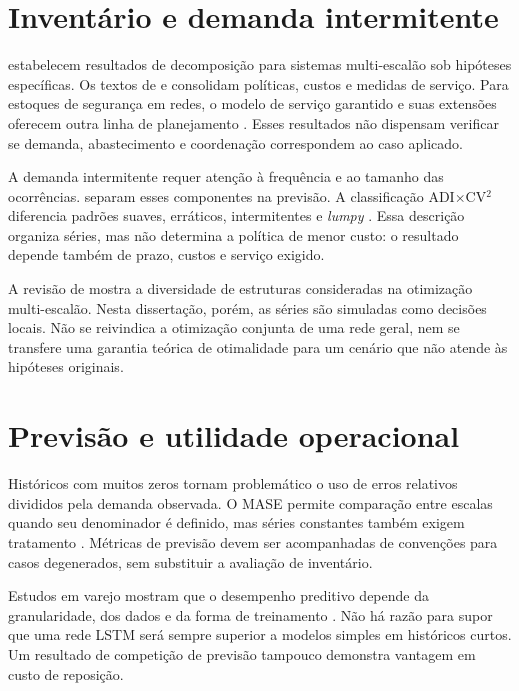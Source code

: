 \section{Inventário e demanda intermitente}

\citet{ClarkScarf1960MultiEchelon} estabelecem resultados de decomposição para sistemas multi-escalão sob hipóteses específicas. Os textos de \citet{Axsater2006InventoryControl} e \citet{Zipkin2000FoundationsInventory} consolidam políticas, custos e medidas de serviço. Para estoques de segurança em redes, o modelo de serviço garantido e suas extensões oferecem outra linha de planejamento \citep{GravesWillems2000SafetyStock,Eruguz2016GSMsurvey,Achkar2024GSMExtensions}. Esses resultados não dispensam verificar se demanda, abastecimento e coordenação correspondem ao caso aplicado.

A demanda intermitente requer atenção à frequência e ao tamanho das ocorrências. \citet{Croston1972ForecastingIntermittentDemand} separam esses componentes na previsão. A classificação ADI$\times$CV$^2$ diferencia padrões suaves, erráticos, intermitentes e \textit{lumpy} \citep{Syntetos2005Categorization}. Essa descrição organiza séries, mas não determina a política de menor custo: o resultado depende também de prazo, custos e serviço exigido.

A revisão de \citet{DeKok2018Typology} mostra a diversidade de estruturas consideradas na otimização multi-escalão. Nesta dissertação, porém, as séries são simuladas como decisões locais. Não se reivindica a otimização conjunta de uma rede geral, nem se transfere uma garantia teórica de otimalidade para um cenário que não atende às hipóteses originais.

\section{Previsão e utilidade operacional}

Históricos com muitos zeros tornam problemático o uso de erros relativos divididos pela demanda observada. O MASE permite comparação entre escalas quando seu denominador é definido, mas séries constantes também exigem tratamento \citep{Hyndman2006MASE}. Métricas de previsão devem ser acompanhadas de convenções para casos degenerados, sem substituir a avaliação de inventário.

Estudos em varejo mostram que o desempenho preditivo depende da granularidade, dos dados e da forma de treinamento \citep{Makridakis2020M4Competition,Nasseri2023RetailDemandPrediction}. Não há razão para supor que uma rede LSTM será sempre superior a modelos simples em históricos curtos. Um resultado de competição de previsão tampouco demonstra vantagem em custo de reposição.

